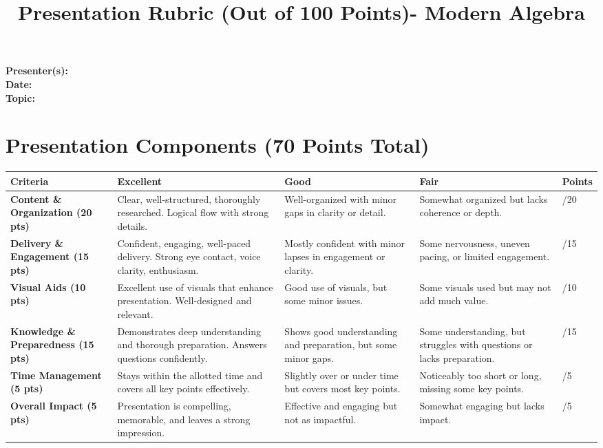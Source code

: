 \documentclass{article}
\begin{document}
\title{Presentation Rubric (Out of 100 Points)- Modern Algebra} 
\author{}
\date{}

\maketitle

\noindent
\textbf{Presenter(s):} \underline{\hspace{10cm}} \\
\textbf{Date:} \underline{\hspace{4cm}} \\
\textbf{Topic:} \underline{\hspace{10cm}}

\section*{Presentation Components (70 Points Total)}

\renewcommand{\arraystretch}{1.3}
\begin{tabular}{|p{4cm}|p{3cm}|p{3cm}|p{3cm}|p{2cm}|}
    \hline
    \textbf{Criteria} & \textbf{Excellent} & \textbf{Good} & \textbf{Fair} & \textbf{Points} \\
    \hline
    \textbf{Content \& Organization (20 pts)} & Clear, well-structured, thoroughly researched. Logical flow with strong details. & Well-organized with minor gaps in clarity or detail. & Somewhat organized but lacks coherence or depth. & \hspace{1cm} /20 \\
    \hline
    \textbf{Delivery \& Engagement (15 pts)} & Confident, engaging, well-paced delivery. Strong eye contact, voice clarity, enthusiasm. & Mostly confident with minor lapses in engagement or clarity. & Some nervousness, uneven pacing, or limited engagement. & \hspace{1cm} /15 \\
    \hline
    \textbf{Visual Aids (10 pts)} & Excellent use of visuals that enhance presentation. Well-designed and relevant. & Good use of visuals, but some minor issues. & Some visuals used but may not add much value. & \hspace{1cm} /10 \\
    \hline
    \textbf{Knowledge \& Preparedness (15 pts)} & Demonstrates deep understanding and thorough preparation. Answers questions confidently. & Shows good understanding and preparation, but some minor gaps. & Some understanding, but struggles with questions or lacks preparation. & \hspace{1cm} /15 \\
    \hline
    \textbf{Time Management (5 pts)} & Stays within the allotted time and covers all key points effectively. & Slightly over or under time but covers most key points. & Noticeably too short or long, missing some key points. & \hspace{1cm} /5 \\
    \hline
    \textbf{Overall Impact (5 pts)} & Presentation is compelling, memorable, and leaves a strong impression. & Effective and engaging but not as impactful. & Somewhat engaging but lacks impact. & \hspace{1cm} /5 \\
    \hline
\end{tabular}
\newpage
\end{document}
